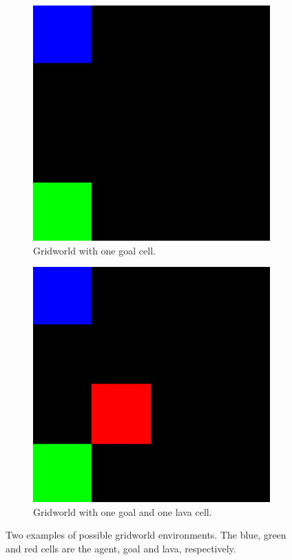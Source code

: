 \documentclass[11pt, a4paper, bibliography=totoc]{report}
\begin{document}
\begin{figure}[h]
	\centering
	\begin{subfigure}{.3\textwidth}
		\centering
		\includegraphics[width=\linewidth]{grid2}
		\caption{Gridworld with one goal cell.}
		\label{fig:grida}
	\end{subfigure}\hspace{.1\textwidth}
	\begin{subfigure}{.3\textwidth}
		\centering
		\includegraphics[width=\linewidth]{grid}
		\caption{Gridworld with one goal and one lava cell.}
		\label{fig:gridb}
	\end{subfigure}
	\caption{Two examples of possible gridworld environments. The blue, green and red cells are the agent, goal and lava, respectively.}
	\label{fig:grid}
\end{figure}
\end{document}
